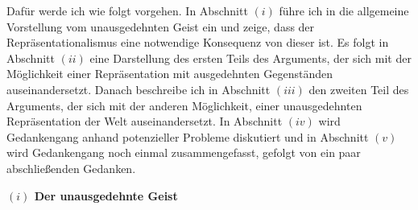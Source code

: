 \documentclass[a4paper, 12pt]{article}
\begin{document}
\begin{onehalfspace}
\vspace{3mm}

Dafür werde ich wie folgt vorgehen. In Abschnitt $(i)$ führe ich in die allgemeine Vorstellung vom unausgedehnten Geist ein und zeige, dass der Repräsentationalismus eine notwendige Konsequenz von dieser ist. Es folgt in Abschnitt $(ii)$ eine Darstellung des ersten Teils des Arguments, der sich mit der Möglichkeit einer Repräsentation mit ausgedehnten Gegenständen auseinandersetzt. Danach beschreibe ich in Abschnitt $(iii)$ den zweiten Teil des Arguments, der sich mit der anderen Möglichkeit, einer unausgedehnten Repräsentation der Welt auseinandersetzt. In Abschnitt $(iv)$ wird Gedankengang anhand potenzieller Probleme diskutiert und in Abschnitt $(v)$ wird Gedankengang noch einmal zusammengefasst, gefolgt von ein paar abschließenden Gedanken.


\vspace{5mm}
\noindent\textbf{$(i)$ Der unausgedehnte Geist}



\end{onehalfspace}
\end{document}
